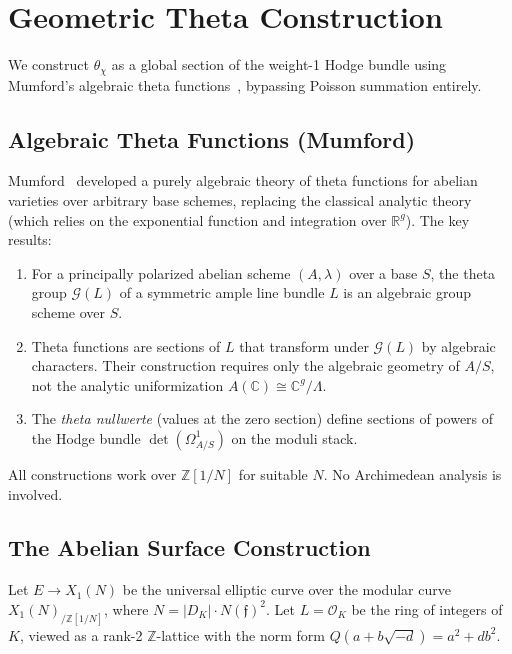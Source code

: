 \documentclass[11pt,a4paper]{article}
\theoremstyle{plain}
\theoremstyle{definition}
\newcommand{\Z}{\mathbb{Z}}
\newcommand{\R}{\mathbb{R}}
\newcommand{\C}{\mathbb{C}}
\begin{document}
\section{Geometric Theta Construction}\label{sec:geometric}

We construct $\theta_\chi$ as a global section of the weight-1 Hodge bundle using Mumford's algebraic theta functions~\cite{mumford66}, bypassing Poisson summation entirely.

\subsection{Algebraic Theta Functions (Mumford)}

Mumford~\cite{mumford66,mumford67} developed a purely algebraic theory of theta functions for abelian varieties over arbitrary base schemes, replacing the classical analytic theory (which relies on the exponential function and integration over $\R^g$). The key results:

\begin{enumerate}[label=(\arabic*)]
\item For a principally polarized abelian scheme $(A, \lambda)$ over a base $S$, the theta group $\mathcal{G}(L)$ of a symmetric ample line bundle $L$ is an algebraic group scheme over $S$.
\item Theta functions are sections of $L$ that transform under $\mathcal{G}(L)$ by algebraic characters. Their construction requires only the algebraic geometry of $A/S$, not the analytic uniformization $A(\C) \cong \C^g / \Lambda$.
\item The \emph{theta nullwerte} (values at the zero section) define sections of powers of the Hodge bundle $\det(\Omega^1_{A/S})$ on the moduli stack.
\end{enumerate}

All constructions work over $\Z[1/N]$ for suitable $N$. No Archimedean analysis is involved.

\subsection{The Abelian Surface Construction}

Let $E \to X_1(N)$ be the universal elliptic curve over the modular curve $X_1(N)_{/\Z[1/N]}$, where $N = |D_K| \cdot N(\mathfrak{f})^2$. Let $L = \mathcal{O}_K$ be the ring of integers of $K$, viewed as a rank-2 $\Z$-lattice with the norm form $Q(a + b\sqrt{-d}) = a^2 + db^2$.
\end{document}
